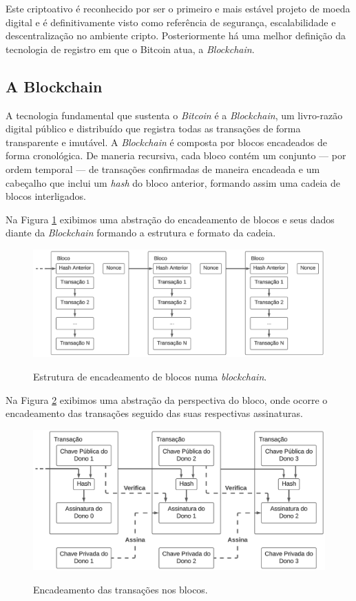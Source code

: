 \documentclass[article,12pt,oneside,a4paper,english,brazil]{unifil}
\begin{document}
\begin{Spacing}{1.5}
Este criptoativo é reconhecido por ser o primeiro e mais estável projeto de moeda digital e é definitivamente visto como referência de segurança, escalabilidade e descentralização no ambiente cripto. Posteriormente há uma melhor definição da tecnologia de registro em que o Bitcoin atua, a \textit{Blockchain}.

\subsection*{A Blockchain} \label{subsec:blockchain}

A tecnologia fundamental que sustenta o \textit{Bitcoin} é a \textit{Blockchain}, um livro-razão digital público e distribuído que registra todas as transações de forma transparente e imutável. A \textit{Blockchain} é composta por blocos encadeados de forma cronológica. De maneria recursiva, cada bloco contém um conjunto — por ordem temporal — de transações confirmadas de maneira encadeada e um cabeçalho que inclui um \textit{hash} do bloco anterior, formando assim uma cadeia de blocos interligados.

Na Figura \ref*{fig:blockchain} exibimos uma abstração do encadeamento de blocos e seus dados diante da \textit{Blockchain} formando a estrutura e formato da cadeia.

\begin{figure}[!hbt]
	\centering
	\caption{Estrutura de encadeamento de blocos numa \textit{blockchain}.}
	\includegraphics[width=.8\linewidth]{../images/figura 2.png}
	\label{fig:blockchain}
\end{figure}

Na Figura \ref*{fig:transactions} exibimos uma abstração da perspectiva do bloco, onde ocorre o encadeamento das transações seguido das suas respectivas assinaturas.

\begin{figure}[!hbt]
	\centering
	\caption{Encadeamento das transações nos blocos.}
	\includegraphics[width=.8\linewidth]{../images/figura 1.png}
	\label{fig:transactions}


\end{figure}
\end{Spacing}
\end{document}
